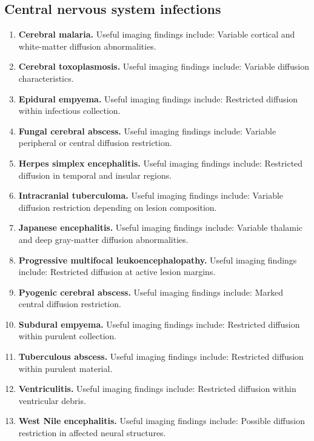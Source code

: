 \subsection{Central nervous system infections}
\begin{enumerate}[leftmargin=*,itemsep=0.45em,topsep=0.4em]
\item \textbf{Cerebral malaria.} Useful imaging findings include: Variable cortical and white-matter diffusion abnormalities.
\item \textbf{Cerebral toxoplasmosis.} Useful imaging findings include: Variable diffusion characteristics.
\item \textbf{Epidural empyema.} Useful imaging findings include: Restricted diffusion within infectious collection.
\item \textbf{Fungal cerebral abscess.} Useful imaging findings include: Variable peripheral or central diffusion restriction.
\item \textbf{Herpes simplex encephalitis.} Useful imaging findings include: Restricted diffusion in temporal and insular regions.
\item \textbf{Intracranial tuberculoma.} Useful imaging findings include: Variable diffusion restriction depending on lesion composition.
\item \textbf{Japanese encephalitis.} Useful imaging findings include: Variable thalamic and deep gray-matter diffusion abnormalities.
\item \textbf{Progressive multifocal leukoencephalopathy.} Useful imaging findings include: Restricted diffusion at active lesion margins.
\item \textbf{Pyogenic cerebral abscess.} Useful imaging findings include: Marked central diffusion restriction.
\item \textbf{Subdural empyema.} Useful imaging findings include: Restricted diffusion within purulent collection.
\item \textbf{Tuberculous abscess.} Useful imaging findings include: Restricted diffusion within purulent material.
\item \textbf{Ventriculitis.} Useful imaging findings include: Restricted diffusion within ventricular debris.
\item \textbf{West Nile encephalitis.} Useful imaging findings include: Possible diffusion restriction in affected neural structures.
\end{enumerate}

